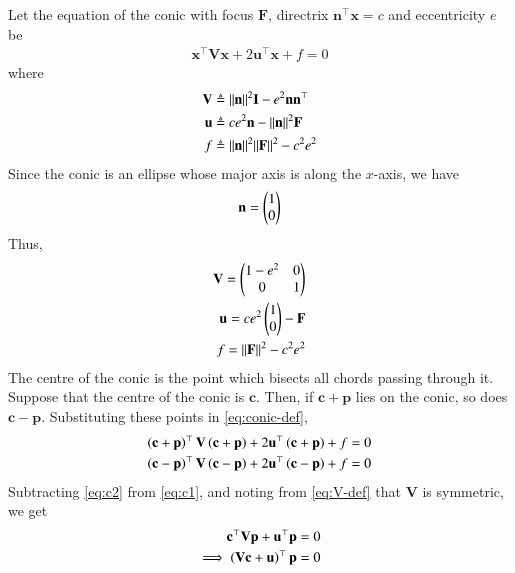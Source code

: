 \documentclass[journal,12pt,twocolumn]{IEEEtran}
\renewcommand{\vec}[1]{\boldsymbol{\mathbf{#1}}}
\begin{document}
\begin{enumerate}
    \solution Let the equation of the conic with focus $\vec{F}$, directrix
    $\vec{n}^\top\vec{x} = c$ and eccentricity $e$ be
    \begin{align}
        \vec{x}^\top\vec{V}\vec{x} + 2\vec{u}^\top\vec{x} + f = 0
        \label{eq:conic-def}
    \end{align}
    where
    \begin{align}
        \vec{V} &\triangleq \norm{\vec{n}}^2\vec{I} - e^2\vec{n}\vec{n}^\top \label{eq:V-def} \\
        \vec{u} &\triangleq ce^2\vec{n} - \norm{\vec{n}}^2\vec{F} \label{eq:u-def} \\
        f &\triangleq \norm{\vec{n}}^2\norm{\vec{F}}^2 - c^2e^2 \label{eq:f-def}
    \end{align}
    Since the conic is an ellipse whose major axis is along the $x$-axis, we have
    \begin{align}
        \vec{n} = \myvec{1\\0}
    \end{align}
    Thus,
    \begin{align}
        \vec{V} = \myvec{1-e^2&0\\0&1} \label{eq:V-val} \\
        \vec{u} = ce^2\myvec{1\\0} - \vec{F} \label{eq:u-val} \\
        f = \norm{\vec{F}}^2 - c^2e^2 \label{eq:f-val}
    \end{align}
    The centre of the conic is the point which bisects all chords passing 
    through it. Suppose that the centre of the conic is $\vec{c}$. Then, if
    $\vec{c}+\vec{p}$ lies on the conic, so does $\vec{c}-\vec{p}$. Substituting 
    these points in \eqref{eq:conic-def},
    \begin{align}
        \brak{\vec{c}+\vec{p}}^\top\vec{V}\brak{\vec{c}+\vec{p}} + 2\vec{u}^\top\brak{\vec{c}+\vec{p}} + f &= 0 \label{eq:c1} \\
        \brak{\vec{c}-\vec{p}}^\top\vec{V}\brak{\vec{c}-\vec{p}} + 2\vec{u}^\top\brak{\vec{c}-\vec{p}} + f &= 0 \label{eq:c2}
    \end{align}
    Subtracting \eqref{eq:c2} from \eqref{eq:c1}, and noting from 
    \eqref{eq:V-def} that $\vec{V}$ is symmetric, we get
    \begin{align}
        \vec{c}^\top\vec{Vp} + \vec{u}^\top\vec{p} &= 0 \\
        \implies \brak{\vec{Vc} + \vec{u}}^\top\vec{p} &= 0 \\

\end{align}
\end{enumerate}
\end{document}
